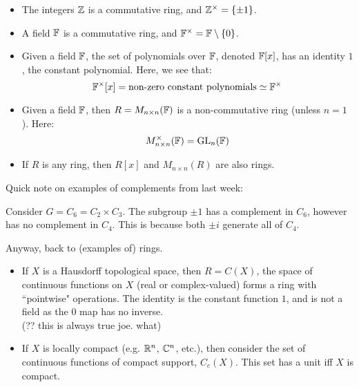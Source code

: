\begin{xmp}[source=Primary Source Material]
    \begin{itemize}
        \item The integers $ \mathbb{Z} $ is a commutative ring, and $ \mathbb{Z}^{\times} = \left\{{\pm 1}\right\} $.
        \item A field $ \mathbb{F} $ is a commutative ring, and
            $ \mathbb{F}^{\times} = \mathbb{F} \setminus \left\{{0}\right\} $.
        \item Given a field $ \mathbb{F} $, the set of polynomials over $ \mathbb{F} $,
            denoted $ \mathbb{F}[x] $, has an identity $ 1 $, the constant polynomial.
            Here, we see that:
            \begin{equation*}
                \mathbb{F}^{\times}[x] = \textrm{non-zero constant polynomials} \simeq \mathbb{F}^{\times}
            \end{equation*}
        \item Given a field $ \mathbb{F} $,
            then $ R = M_{n\times n}(\mathbb{F}) $ is a non-commutative ring (unless $ n = 1 $). Here:
            \begin{equation*}
                M_{n\times n}^{\times}(\mathbb{F}) = \operatorname{GL}_{n}(\mathbb{F})
            \end{equation*}
        \item If $ R $ is any ring, then $ R[x] $ and $ M_{n \times n}(R) $ are also rings.
    \end{itemize}
\end{xmp}


Quick note on examples of complements from last week:

Consider $ G = C_{6} = C_{2} \times C_{3} $.
The subgroup $ {\pm1} $ has a complement in $ C_{6} $, however has no complement in $ C_{4} $.
This is because both $ \pm i $ generate all of $ C_{4} $.

Anyway, back to (examples of) rings.

\begin{xmp}[source=Primary Source Material]
    \begin{itemize}
        \item If $ X $ is a Hausdorff topological space, then $ R = C(X) $,
            the space of continuous functions on $ X $ (real or complex-valued) forms
            a ring with ``pointwise" operations. \vsp
            The identity is the constant function $ 1 $, and is not a field as
            the $ 0 $ map has no inverse. \\
            (?? this is always true joe. what)
        \item If $ X $ is locally compact (e.g. $ \mathbb{R}^{n} $, $ \mathbb{C}^{n} $, etc.), then
            consider the set of continuous functions of compact support, $ C_{c}(X) $.
            This set has a unit iff $ X $ is compact.
    \end{itemize}
\end{xmp}

